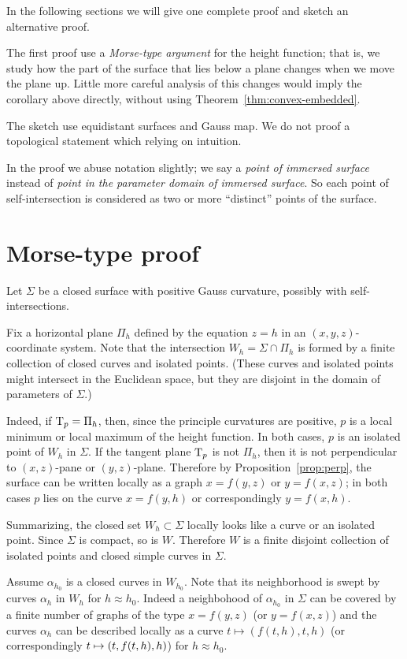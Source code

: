 In the following sections we will give one complete proof and sketch an alternative proof.

The first proof use a \emph{Morse-type argument} for the height function;
that is, we study how the part of the surface that lies below a plane changes when we move the plane up.
Little more careful analysis of this changes would imply the corollary above directly, without using Theorem~\ref{thm:convex-embedded}.

The sketch use equidistant surfaces and Gauss map.
We do not proof a topological statement which relying on intuition.

In the proof we abuse notation slightly;
we say a \emph{point of immersed surface} instead of \emph{point in the parameter domain of immersed surface}.
So each point of self-intersection is considered as two or more ``distinct'' points of the surface.

\section{Morse-type proof}

Let $\Sigma$ be a closed surface with positive Gauss curvature, possibly with self-intersections. 

Fix a horizontal plane $\Pi_h$ defined by the equation $z=h$ in an $(x,y,z)$-coordinate system.
Note that the intersection $W_h=\Sigma\cap\Pi_h$ is formed by a finite collection of closed curves and isolated points.
(These curves and isolated points might intersect in the Euclidean space, but they are disjoint in the domain of parameters of $\Sigma$.)

Indeed, if $\mathrm{T}_p=\Pi_h$, then, since the principle curvatures are positive, $p$ is a local minimum or local maximum of the height function.
In both cases, $p$ is an isolated point of $W_h$ in $\Sigma$.
If the tangent plane $\mathrm{T}_p$ is not $\Pi_h$, then it is not perpendicular to $(x,z)$-pane or $(y,z)$-plane.
Therefore by Proposition~\ref{prop:perp}, the surface can be written locally as a graph $x=f(y,z)$ or $y=f(x,z)$;
in both cases $p$ lies on the curve $x=f(y,h)$ or correspondingly $y=f(x,h)$.

Summarizing, the closed set $W_h\subset \Sigma$ locally looks like a curve or an isolated point.
Since $\Sigma$ is compact, so is $W$.
Therefore $W$ is a finite disjoint collection of isolated points and closed simple curves in $\Sigma$.

Assume $\alpha_{h_0}$ is a closed curves in $W_{h_0}$.
Note that its neighborhood is swept by curves $\alpha_h$ in $W_{h}$ for $h\approx h_0$.
Indeed a neighbohood of $\alpha_{h_0}$ in $\Sigma$ can be covered by a finite number of graphs of the type $x=f(y,z)$ (or $y=f(x,z)$) and the curves $\alpha_h$ can be described locally as a curve $t\mapsto (f(t,h),t,h)$ (or correspondingly $t\z\mapsto(t,f(t,h),h)$) for $h\approx h_0$.

